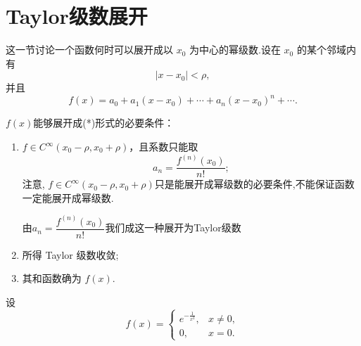 \section{Taylor级数展开}

这一节讨论一个函数何时可以展开成以 $x_0$ 为中心的幂级数.设在 $x_0$ 的某个邻域内有
\[
\left|x-x_0\right|<\rho,
\]
并且
\[
f(x)=a_0+a_1(x-x_0)+\cdots+a_n(x-x_0)^n+\cdots .\tag{*}
\]

$f(x)$能够展开成(*)形式的必要条件：
\begin{enumerate}
	\item $f\in C^\infty(x_0-\rho,x_0+\rho)$，且系数只能取
	\[
	a_n=\frac{f^{(n)}(x_0)}{n!};
	\]
	注意, $f\in C^\infty(x_0-\rho,x_0+\rho)$只是能展开成幂级数的必要条件,不能保证函数一定能展开成幂级数.
	
	由$a_n=\dfrac{f^{(n)}(x_0)}{n!}$我们成这一种展开为Taylor级数
	\item 所得 Taylor 级数收敛;
	\item 其和函数确为 $f(x)$.
\end{enumerate}
\begin{example}
	设
	\[
	f(x)=
	\begin{cases}
		e^{-\frac{1}{x^2}},&x\neq0,\\[6pt]
		0,&x=0.
	\end{cases}
	\]
\end{example}

